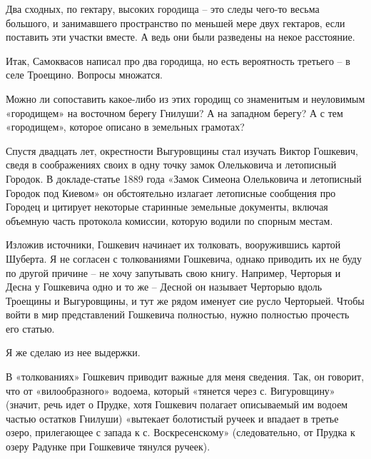 Два сходных, по гектару, высоких городища – это следы чего-то весьма большого, и занимавшего пространство по меньшей мере двух гектаров, если поставить эти участки вместе. А ведь они были разведены на некое расстояние.

Итак, Самоквасов написал про два городища, но есть вероятность третьего – в селе Троещино. Вопросы множатся.

Можно ли сопоставить какое-либо из этих городищ со знаменитым и неуловимым «городищем» на восточном берегу Гнилуши? А на западном берегу? А с тем «городищем», которое описано в земельных грамотах?

Спустя двадцать лет, окрестности Выгуровщины стал изучать Виктор Гошкевич, сведя в соображениях своих в одну точку замок Олельковича и летописный Городок. В докладе-статье 1889 года «Замок Симеона Олельковича и летописный Городок под Киевом» он обстоятельно излагает летописные сообщения про Городец и цитирует некоторые старинные земельные документы, включая объемную часть протокола комиссии, которую водили по спорным местам.

Изложив источники, Гошкевич начинает их толковать, вооружившись картой Шуберта. Я не согласен с толкованиями Гошкевича, однако приводить их не буду по другой причине – не хочу запутывать свою книгу. Например, Черторыя и Десна у Гошкевича одно и то же – Десной он называет Черторыю вдоль Троещины и Выгуровщины, и тут же рядом именует сие русло Черторыей. Чтобы войти в мир представлений Гошкевича полностью, нужно полностью прочесть его статью.

Я же сделаю из нее выдержки.

В «толкованиях» Гошкевич приводит важные для меня сведения. Так, он говорит, что от «вилообразного» водоема, который «тянется через с. Вигуровщину» (значит, речь идет о Прудке, хотя Гошкевич полагает описываемый им водоем частью остатков Гнилуши) «вытекает болотистый ручеек и впадает в третье озеро, прилегающее с запада к с. Воскресенскому» (следовательно, от Прудка к озеру Радунке при Гошкевиче тянулся ручеек).



